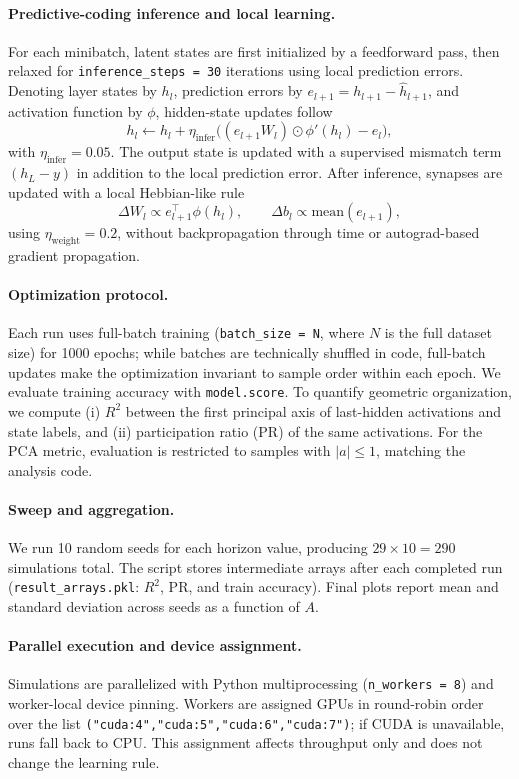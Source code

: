 \documentclass{article}
\begin{document}
\paragraph{Predictive-coding inference and local learning.}
For each minibatch, latent states are first initialized by a feedforward pass, then relaxed for
\texttt{inference\_steps = 30} iterations using local prediction errors.
Denoting layer states by \(h_l\), prediction errors by
\(e_{l+1} = h_{l+1} - \hat{h}_{l+1}\), and activation function by \(\phi\),
hidden-state updates follow
\[
h_l \leftarrow h_l + \eta_{\mathrm{infer}}
\Big((e_{l+1}W_l)\odot \phi'(h_l) - e_l\Big),
\]
with \(\eta_{\mathrm{infer}} = 0.05\).
The output state is updated with a supervised mismatch term
\((h_L - y)\) in addition to the local prediction error.
After inference, synapses are updated with a local Hebbian-like rule
\[
\Delta W_l \propto e_{l+1}^{\top}\phi(h_l), \qquad
\Delta b_l \propto \mathrm{mean}(e_{l+1}),
\]
using \(\eta_{\mathrm{weight}} = 0.2\), without backpropagation through time or
autograd-based gradient propagation.

\paragraph{Optimization protocol.}
Each run uses full-batch training (\texttt{batch\_size = N}, where \(N\) is the full dataset size)
for 1000 epochs; while batches are technically shuffled in code, full-batch updates make the
optimization invariant to sample order within each epoch.
We evaluate training accuracy with \texttt{model.score}.
To quantify geometric organization, we compute (i) \(R^2\) between the first principal axis of
last-hidden activations and state labels, and (ii) participation ratio (PR) of the same activations.
For the PCA metric, evaluation is restricted to samples with \(|a|\le 1\), matching the analysis code.

\paragraph{Sweep and aggregation.}
We run 10 random seeds for each horizon value, producing \(29 \times 10 = 290\) simulations total.
The script stores intermediate arrays after each completed run
(\texttt{result\_arrays.pkl}: \(R^2\), PR, and train accuracy).
Final plots report mean and standard deviation across seeds as a function of \(A\).

\paragraph{Parallel execution and device assignment.}
Simulations are parallelized with Python multiprocessing
(\texttt{n\_workers = 8}) and worker-local device pinning.
Workers are assigned GPUs in round-robin order over the list
\texttt{("cuda:4","cuda:5","cuda:6","cuda:7")}; if CUDA is unavailable, runs fall back to CPU.
This assignment affects throughput only and does not change the learning rule.
\end{document}
